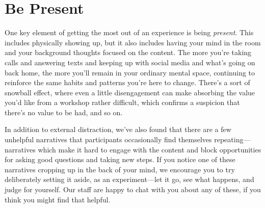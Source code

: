 \clearpage
\section*{Be Present}

One key element of getting the most out of an experience is being \emph{present}. This includes physically showing up, but it also includes having your mind in the room and your background thoughts focused on the content. The more you're taking calls and answering texts and keeping up with social media and what's going on back home, the more you'll remain in your ordinary mental space, continuing to reinforce the same habits and patterns you're here to change.  There's a sort of snowball effect, where even a little disengagement can make absorbing the value you'd like from a workshop rather difficult, which confirms a suspicion that there's no value to be had, and so on.

In addition to external distraction, we've also found that there are a few unhelpful narratives that participants occasionally find themselves repeating---narratives which make it hard to engage with the content and block opportunities for asking good questions and taking new steps.  If you notice one of these narratives cropping up in the back of your mind, we encourage you to try deliberately setting it aside, as an experiment---let it go, see what happens, and judge for yourself.  Our staff are happy to chat with you about any of these, if you think you might find that helpful.

